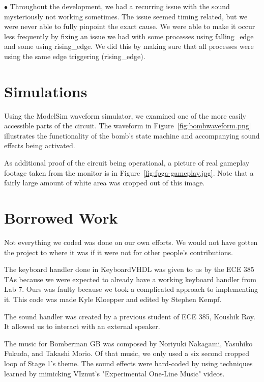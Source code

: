 \documentclass[10pt,a4paper]{article}
\begin{document}
$ \bullet $ Throughout the development, we had a recurring issue with the sound mysteriously not working sometimes. The issue seemed timing related, but we were never able to fully pinpoint the exact cause. We were able to make it occur less frequently by fixing an issue we had with some processes using falling\_edge and some using rising\_edge. We did this by making sure that all processes were using the same edge triggering (rising\_edge).

\section{Simulations}
Using the ModelSim waveform simulator, we examined one of the more easily accessible parts of the circuit. The waveform in Figure~\ref{fig:bombwaveform.png} illustrates the functionality of the bomb's state machine and accompanying sound effects being activated.


As additional proof of the circuit being operational, a picture of real gameplay footage taken from the monitor is in Figure~\ref{fig:fpga-gameplay.jpg}. Note that a fairly large amount of white area was cropped out of this image.

\section{Borrowed Work}
Not everything we coded was done on our own efforts. We would not have gotten the project to where it was if it were not for other people's contributions.

The keyboard handler done in KeyboardVHDL was given to us by the ECE 385 TAs because we were expected to already have a working keyboard handler from Lab 7. Ours was faulty because we took a complicated approach to implementing it. This code was made Kyle Kloepper and edited by Stephen Kempf.

The sound handler was created by a previous student of ECE 385, Koushik Roy. It allowed us to interact with an external speaker.

The music for Bomberman GB was composed by Noriyuki Nakagami, Yasuhiko Fukuda, and Takashi Morio. Of that music, we only used a six second cropped loop of Stage 1's theme. The sound effects were hard-coded by using techniques learned by mimicking VIznut's "Experimental One-Line Music" videos.
\end{document}
